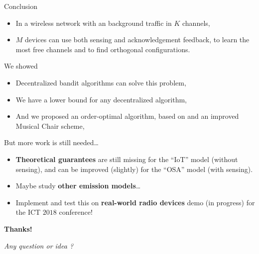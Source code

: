 \documentclass[12pt,english,ignorenonframetext,]{beamer}
\providecommand{\tightlist}{%
  \setlength{\itemsep}{0pt}\setlength{\parskip}{0pt}}
\begin{document}
\begin{frame}[allowframebreaks]{Conclusion}

\begin{itemize}
\tightlist
\item
  In a wireless network with an \iid{} background traffic in \(K\)
  channels,
\item
  \(M\) devices can use both sensing and acknowledgement feedback, to
  learn the most free channels and to find orthogonal configurations.
\end{itemize}

\begin{block}{We showed \Smiley[1.4]}

\begin{itemize}
\tightlist
\item
  Decentralized bandit algorithms can solve this problem,
\item
  We have a lower bound for any decentralized algorithm,
\item
  And we proposed an order-optimal algorithm, based on \klUCB{} and an
  improved Musical Chair scheme, \MCTopM
\end{itemize}

\end{block}

\begin{block}{But more work is still needed\ldots{} \Sey[1.4]}

\begin{itemize}
\tightlist
\item
  \textbf{Theoretical guarantees} are still missing for the ``IoT''
  model (without sensing), and can be improved (slightly) for the
  ``OSA'' model (with sensing).
\item
  Maybe study \textbf{other emission models}\ldots{}
\item
  Implement and test this on \textbf{real-world radio devices}
  \hook demo (in progress) for the ICT \(2018\) conference!
\end{itemize}

\end{block}

\begin{block}{\textbf{Thanks!} \Smiley[1.4]}

\begin{center}\begin{Large}
\emph{Any question or idea ?}
\end{Large}\end{center}

\end{block}

\end{frame}
\end{document}
